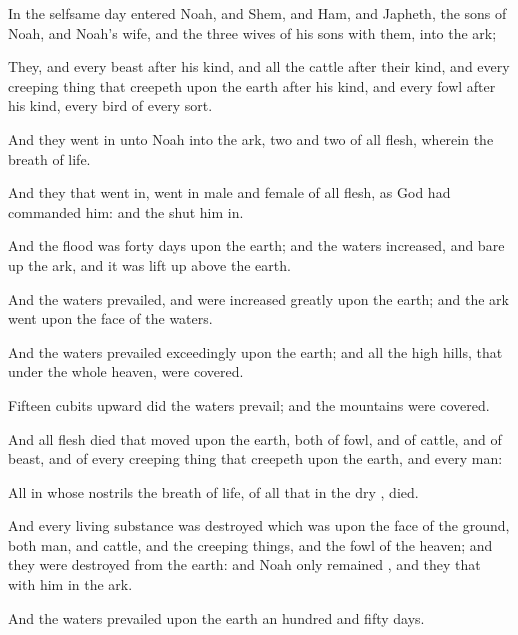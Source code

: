 {\par }{\PP {}In the
selfsame
day
entered
Noah, and
Shem, and
Ham, and
Japheth, the
sons of
Noah, and
Noah’s
wife, and the
three
wives of his
sons with them, into the
ark;

They, and every
beast after his
kind, and all the
cattle after their
kind, and every creeping
thing that
creepeth upon the
earth after his
kind, and every
fowl after his
kind, every
bird of every
sort.

And they went
in unto
Noah into the
ark,
two and
two of all
flesh,
wherein
{} the
breath of
life.

And they that went
in, went
in
male and
female of all
flesh, as
God had
commanded him: and the
{} shut him
in.


\par }{\PP {}And the
flood was
forty
days upon the
earth; and the
waters
increased, and bare
up the
ark, and it was lift
up above the
earth.

And the
waters
prevailed, and were
increased
greatly upon the
earth; and the
ark
went upon the
face of the
waters.

And the
waters
prevailed
exceedingly upon the
earth; and all the
high
hills, that
{}
under the whole
heaven, were
covered.

Fifteen
cubits
upward did the
waters
prevail; and the
mountains were
covered.


\par }{\PP {}And all
flesh
died that
moved upon the
earth, both of
fowl, and of
cattle, and of
beast, and of every creeping
thing that
creepeth upon the
earth, and every
man:

All in whose
nostrils
{} the
breath of
life, of all that
{} in the
dry
{},
died.

And every living
substance was
destroyed which was upon the
face of the
ground, both
man, and
cattle, and the creeping
things, and the
fowl of the
heaven; and they were
destroyed from the
earth: and
Noah
only
remained
{}, and they
that
{} with him in the
ark.

And the
waters
prevailed upon the
earth an
hundred and
fifty
days.




\par }

